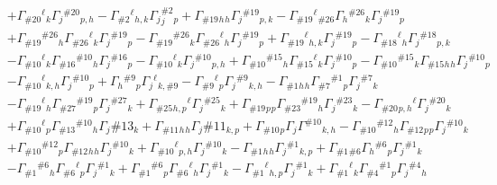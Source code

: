 \begin{example}
\begin{equation*}
\begin{aligned}
      & +\Gamma_{\# 20}{ }^{\ell}{ }_k \Gamma_j{ }^{\# 20}{ }_{p, h}-\Gamma_{\# 2}{ }^{\ell}{ }_{h, k} \Gamma_j{ }_j^{\# 2}{ }_p+\Gamma_{\# 19}{ }_h{ }_h \Gamma_j{ }^{\# 19}{ }_{p, k}-\Gamma_{\# 19}{ }^{\ell}{ }_{\# 26} \Gamma_h{ }^{\# 26}{ }_k \Gamma_j{ }^{\# 19}{ }_p \\
      & +\Gamma_{\# 19}{ }^{\# 26}{ }_h \Gamma_{\# 26}{ }^{\ell}{ }_k \Gamma_j{ }^{\# 19}{ }_p-\Gamma_{\# 19}{ }^{\# 26}{ }_k \Gamma_{\# 26}{ }^{\ell}{ }_h \Gamma_j{ }^{\# 19}{ }_p+\Gamma_{\# 19}{ }^{\ell}{ }_{h, k} \Gamma_j{ }^{\# 19}{ }_p-\Gamma_{\# 18}{ }^{\ell}{ }_h \Gamma_j{ }^{\# 18}{ }_{p, k} \\
      & -\Gamma_{\# 10}{ }^{\ell}{ }_k \Gamma_{\# 16}{ }^{\# 10}{ }_h \Gamma_j{ }^{\# 16}{ }_p-\Gamma_{\# 10}{ }^{\ell}{ }_k \Gamma_j{ }^{\# 10}{ }_{p, h}+\Gamma_{\# 10}{ }^{\# 15}{ }_h \Gamma_{\# 15}{ }^{\ell}{ }_k \Gamma_j{ }^{\# 10}{ }_p-\Gamma_{\# 10}{ }^{\# 15}{ }_k \Gamma_{\# 15}{ }_h{ }_h \Gamma_j{ }^{\# 10}{ }_p \\
      & -\Gamma_{\# 10}{ }^{\ell}{ }_{k, h} \Gamma_j{ }^{\# 10}{ }_p+\Gamma_h{ }^{\# 9}{ }_p \Gamma_j{ }^{\ell}{ }_{k, \# 9}-\Gamma_{\# 9}{ }^{\ell}{ }_p \Gamma_j{ }^{\# 9}{ }_{k, h}-\Gamma_{\# 1}{ }_h{ }_h \Gamma_{\# 7}{ }^{\# 1}{ }_p \Gamma_j{ }^{\# 7}{ }_k \\
      & -\Gamma_{\# 19}{ }^{\ell}{ }_h \Gamma_{\# 27}{ }^{\# 19}{ }_p \Gamma_j{ }^{\# 27}{ }_k+\Gamma_{\# 25}{ }_{h, p}{ }^{\ell} \Gamma_j{ }^{\# 25}{ }_k+\Gamma_{\# 19}{ }_p{ }_p \Gamma_{\# 23}{ }^{\# 19}{ }_h \Gamma_j{ }^{\# 23}{ }_k-\Gamma_{\# 20}{ }_{p, h}{ }^{\ell} \Gamma_j{ }^{\# 20}{ }_k \\
      & +\Gamma_{\# 10}{ }^{\ell}{ }_p \Gamma_{\# 13}{ }^{\# 10}{ }_h \Gamma_j \# 13{ }_k+\Gamma_{\# 11}{ }_h{ }_h \Gamma_j \# 11{ }_{k, p}+\Gamma_{\# 10}{ }_p \Gamma_j \Gamma^{\# 10}{ }_{k, h}-\Gamma_{\# 10}{ }^{\# 12}{ }_h \Gamma_{\# 12}{ }_p{ }_p \Gamma_j{ }^{\# 10}{ }_k \\
      & +\Gamma_{\# 10}{ }^{\# 12}{ }_p \Gamma_{\# 12}{ }_h{ }_h \Gamma_j{ }^{\# 10}{ }_k+\Gamma_{\# 10}{ }^{\ell}{ }_{p, h} \Gamma_j{ }^{\# 10}{ }_k-\Gamma_{\# 1}{ }_h{ }_h \Gamma_j{ }^{\# 1}{ }_{k, p}+\Gamma_{\# 1}{ }_{\# 6} \Gamma_h{ }^{\# 6}{ }_p \Gamma_j{ }^{\# 1}{ }_k \\
      & -\Gamma_{\# 1}{ }^{\# 6}{ }_h \Gamma_{\# 6}{ }^{\ell}{ }_p \Gamma_j{ }^{\# 1}{ }_k+\Gamma_{\# 1}{ }^{\# 6}{ }_p \Gamma_{\# 6}{ }^{\ell}{ }_h \Gamma_j{ }^{\# 1}{ }_k-\Gamma_{\# 1}{ }^{\ell}{ }_{h, p} \Gamma_j{ }^{\# 1}{ }_k+\Gamma_{\# 1}{ }^{\ell}{ }_k \Gamma_{\# 4}{ }^{\# 1}{ }_p \Gamma_j{ }^{\# 4}{ }_h \\

\end{aligned}
\end{equation*}
\end{example}
